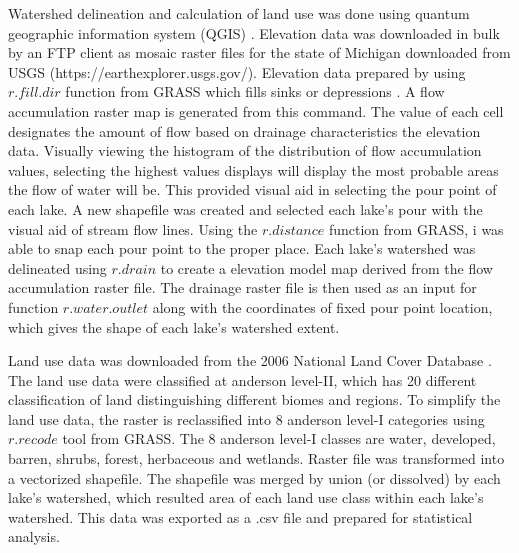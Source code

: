Watershed delineation and calculation of land use was done using quantum geographic information system (QGIS) \cite{qgis_development_team_qgis_2009}.
Elevation data was downloaded in bulk by an FTP client as mosaic raster files for the state of Michigan downloaded from USGS (https://earthexplorer.usgs.gov/).
Elevation data  prepared by using $r.fill.dir$ function from GRASS which fills sinks or depressions \cite{grass_development_team_geographic_2017}. A flow accumulation raster map is generated from this command. The value of each cell designates the amount of flow based on drainage characteristics the elevation data. Visually viewing the histogram of the distribution of flow accumulation values, selecting the highest values displays will display the most probable areas the flow of water will be. This provided visual aid in selecting the pour point of each lake. A new shapefile was created and selected each lake's pour with the visual aid of stream flow lines. Using the $r.distance$ function from GRASS, i was able to snap each pour point to the proper place. Each lake's watershed was delineated using $r.drain$ to create a elevation model map derived from the flow accumulation raster file. The drainage raster file is then used as an input for function $r.water.outlet$ along with the coordinates of fixed pour point location, which gives the shape of each lake's watershed extent.

Land use data was downloaded from the 2006 National Land Cover Database \cite{development_completion_nodate}. The land use data were classified at anderson level-II, which has 20 different classification of land distinguishing different biomes and regions.  To simplify the land use data, the raster is reclassified into 8 anderson level-I categories using $r.recode$ tool from GRASS. The 8 anderson level-I classes are water, developed, barren, shrubs, forest, herbaceous and wetlands. Raster file was transformed into a vectorized shapefile. The shapefile was merged by union (or dissolved) by each lake's watershed, which resulted area of each land use class within each lake's watershed. This data was exported as a .csv file and prepared for statistical analysis.

